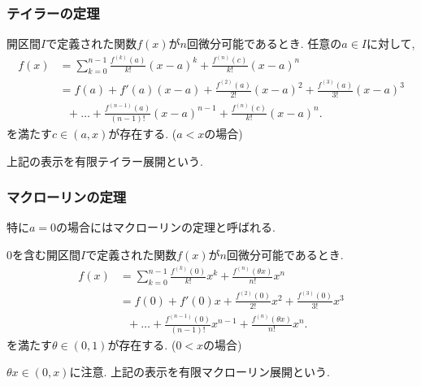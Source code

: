 



\begin{frame}
\frametitle{テイラーの定理}

\begin{Thm}[テイラーの定理] \label{テイラー}
開区間$I$で定義された関数$f(x)$が$n$回微分可能であるとき. 
任意の$a \in I$に対して, 
 \begin{align*}
f(x) & = \sum_{k=0}^{n-1}\frac{f^{(k)}(a)}{k!}(x-a)^k + \frac{f^{(n)}(c)}{k!}(x-a)^n \\
& =  f(a)+ f'(a)(x-a) + \frac{f^{(2)}(a)}{2!}(x-a)^2  + \frac{f^{(3)}(a)}{3!}(x-a)^3 \\
& \ \ \ + \dots + \frac{f^{(n-1)}(a)}{(n-1)!}(x-a)^{n-1}+\frac{f^{(n)}(c)}{k!}(x-a)^n . 
\end{align*}
を満たす$c \in (a,x)$が存在する. ($a<x$の場合) 
\end{Thm}
上記の表示を有限テイラー展開という.

\end{frame}








\begin{frame}
\frametitle{マクローリンの定理}


特に$a=0$の場合にはマクローリンの定理と呼ばれる. 


\begin{Thm}[マクローリンの定理]  \label{マクローリン}
$0$を含む開区間$I$で定義された関数$f(x)$が$n$回微分可能であるとき. 
 \begin{align*}
f(x) & = \sum_{k=0}^{n-1}\frac{f^{(k)}(0)}{k!}x^k + \frac{f^{(n)}(\theta x)}{n!}x^n \\
& =  f(0)+ f'(0)x + \frac{f^{(2)}(0)}{2!}x^2  + \frac{f^{(3)}(0)}{3!}x^3 \\
& \ \ \ + \dots + \frac{f^{(n-1)}(0)}{(n-1)!}x^{n-1}+\frac{f^{(n)}(\theta x)}{n!}x^n . 
\end{align*}
を満たす$\theta \in (0,1)$が存在する. ($0<x$の場合) 
\end{Thm}
$\theta x \in (0,x)$に注意. 上記の表示を有限マクローリン展開という.

\end{frame}


